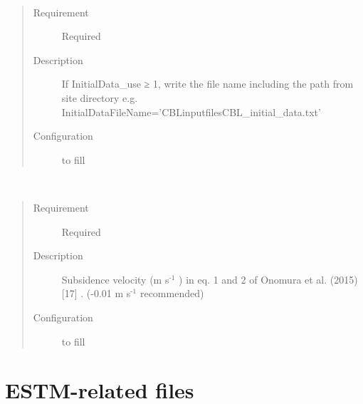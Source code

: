 \documentclass[letterpaper,10pt,english]{sphinxmanual}
\begin{document}
\begin{fulllineitems}
\label{\detokenize{input_files/CBL_input/CBLinput:cmdoption-arg-initialdatafilename}}~\begin{quote}\begin{description}
\item[{Requirement}] \leavevmode
Required

\item[{Description}] \leavevmode
If InitialData\_use ≥ 1, write the file name including the path from site directory e.g. InitialDataFileName=’CBLinputfilesCBL\_initial\_data.txt’

\item[{Configuration}] \leavevmode
to fill

\end{description}\end{quote}

\end{fulllineitems}


\begin{fulllineitems}
\label{\detokenize{input_files/CBL_input/CBLinput:cmdoption-arg-wsb}}~\begin{quote}\begin{description}
\item[{Requirement}] \leavevmode
Required

\item[{Description}] \leavevmode
Subsidence velocity (m s$^{\text{-1}}$ ) in eq. 1 and 2 of Onomura et al. (2015) {[}17{]} . (-0.01 m s$^{\text{-1}}$ recommended)

\item[{Configuration}] \leavevmode
to fill

\end{description}\end{quote}

\end{fulllineitems}



\section{ESTM-related files}
\label{\detokenize{input_files/ESTM_related_files/ESTM_related_files:estm-related-files}}\label{\detokenize{input_files/ESTM_related_files/ESTM_related_files::doc}}
\end{document}
